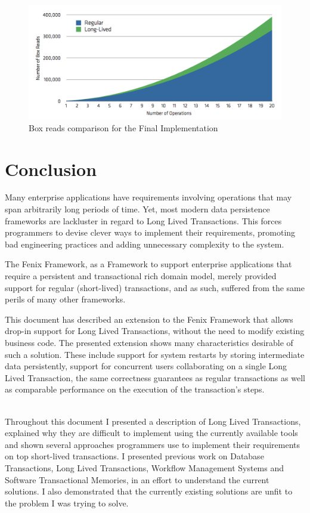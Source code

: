 \documentclass{llncs}
\begin{document}
\begin{figure}
\centering
\includegraphics[width=0.9\linewidth]{box-comparison-final}
\caption{Box reads comparison for the Final Implementation}
\label{fig:boxComparisonFinal}
\end{figure}



\section{Conclusion}

Many enterprise applications have requirements involving operations
that may span arbitrarily long periods of time. Yet, most modern data
persistence frameworks are lackluster in regard to Long Lived
Transactions. This forces programmers to devise clever ways to
implement their requirements, promoting bad engineering practices and
adding unnecessary complexity to the system.

The Fenix Framework, as a Framework to support enterprise applications
that require a persistent and transactional rich domain model, merely
provided support for regular (short-lived) transactions, and as such,
suffered from the same perils of many other frameworks.

This document has described an extension to the Fenix Framework that
allows drop-in support for Long Lived Transactions, without the need
to modify existing business code. The presented extension shows
many characteristics desirable of such a solution. These include
support for system restarts by storing intermediate data persistently,
support for concurrent users collaborating on a single Long Lived
Transaction, the same correctness guarantees as regular transactions
as well as comparable performance on the execution of the
transaction's steps.

~\\

Throughout this document I presented a description of Long Lived
Transactions, explained why they are difficult to implement using the
currently available tools and shown several approaches programmers use
to implement their requirements on top short-lived transactions. I
presented previous work on Database Transactions, Long Lived
Transactions, Workflow Management Systems and Software
Transactional Memories, in an effort to understand the current
solutions. I also demonstrated that the currently existing solutions
are unfit to the problem I was trying to solve.
\end{document}
